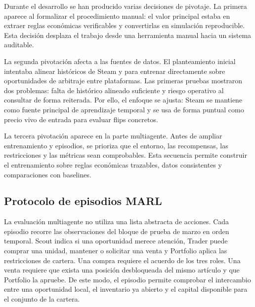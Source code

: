 Durante el desarrollo se han producido varias decisiones de pivotaje. La primera aparece al formalizar el procedimiento manual: el valor principal estaba en extraer reglas económicas verificables y convertirlas en simulación reproducible. Esta decisión desplaza el trabajo desde una herramienta manual hacia un sistema auditable.

La segunda pivotación afecta a las fuentes de datos. El planteamiento inicial intentaba alinear históricos de Steam y  para entrenar directamente sobre oportunidades de arbitraje entre plataformas. Las primeras pruebas mostraron dos problemas: falta de histórico alineado suficiente y riesgo operativo al consultar  de forma reiterada. Por ello, el enfoque se ajusta: Steam se mantiene como fuente principal de aprendizaje temporal y  se usa de forma puntual como precio vivo de entrada para evaluar flips concretos.

La tercera pivotación aparece en la parte multiagente. Antes de ampliar entrenamiento y episodios, se prioriza que el entorno, las recompensas, las restricciones y las métricas sean comprobables. Esta secuencia permite construir el entrenamiento sobre reglas económicas trazables, datos consistentes y comparaciones con baselines.

\subsection{Protocolo de episodios MARL}

La evaluación multiagente no utiliza una lista abstracta de acciones. Cada episodio recorre las observaciones del bloque de prueba de marzo en orden temporal. Scout indica si una oportunidad merece atención, Trader puede comprar una unidad, mantener o solicitar una venta y Portfolio aplica las restricciones de cartera. Una compra requiere el acuerdo de los tres roles. Una venta requiere que exista una posición desbloqueada del mismo artículo y que Portfolio la apruebe. De este modo, el episodio permite comprobar el intercambio entre una oportunidad local, el inventario ya abierto y el capital disponible para el conjunto de la cartera.

